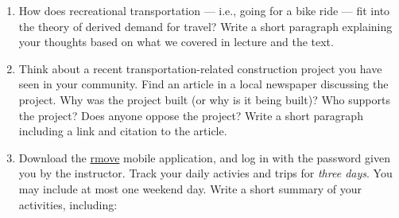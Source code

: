 \documentclass[
]{book}
\begin{document}
\begin{enumerate}
\def\labelenumi{\arabic{enumi}.}
\item
  How does recreational transportation --- i.e., going for a bike ride --- fit into the
  theory of derived demand for travel? Write a short paragraph explaining your thoughts
  based on what we covered in lecture and the text.
\item
  Think about a recent transportation-related construction project you have
  seen in your community. Find an article in a local newspaper discussing the project.
  Why was the project built (or why is it being built)? Who supports the project?
  Does anyone oppose the project? Write a short paragraph including a link and
  citation to the article.
\item
  Download the \href{https://rmove.rsginc.com/}{rmove} mobile application, and log
  in with the password given you by the instructor. Track your daily activies and
  trips for \emph{three days}. You may include at most one weekend day. Write a short
  summary of your activities, including:


\end{enumerate}
\end{document}
